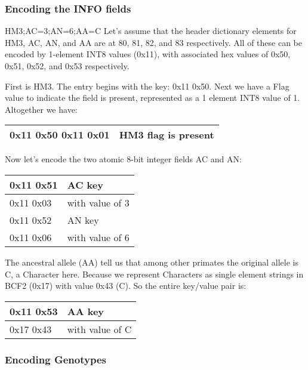 \documentclass[8pt]{article}
\begin{document}
\subsubsection{Encoding the INFO fields}

HM3;AC=3;AN=6;AA=C
Let's assume that the header dictionary elements for HM3, AC, AN, and AA are at 80, 81, 82, and 83 respectively.
All of these can be encoded by 1-element INT8 values (0x11), with associated hex values of 0x50, 0x51, 0x52, and 0x53 respectively.

First is HM3.
The entry begins with the key: 0x11 0x50.
Next we have a Flag value to indicate the field is present, represented as a 1 element INT8 value of 1.
Altogether we have:

\vspace{0.3cm}
\begin{tabular}{|l| l|} \hline
0x11 0x50 0x11 0x01 & HM3 flag is present \\ \hline
\end{tabular}
\vspace{0.3cm}

Now let's encode the two atomic 8-bit integer fields AC and AN:

\vspace{0.3cm}
\begin{tabular}{|l| l|} \hline
0x11 0x51 & AC key \\ \hline
0x11 0x03 & with value of 3 \\ \hline
0x11 0x52 & AN key \\ \hline
0x11 0x06 & with value of 6 \\ \hline
\end{tabular}
\vspace{0.3cm}

The ancestral allele (AA) tell us that among other primates the original allele is C, a Character here.
Because we represent Characters as single element strings in BCF2 (0x17) with value 0x43 (C).
So the entire key/value pair is:

\vspace{0.3cm}
\begin{tabular}{|l |l|} \hline
0x11 0x53 & AA key \\ \hline
0x17 0x43 & with value of C \\ \hline
\end{tabular}

\subsubsection{Encoding Genotypes}
\end{document}
